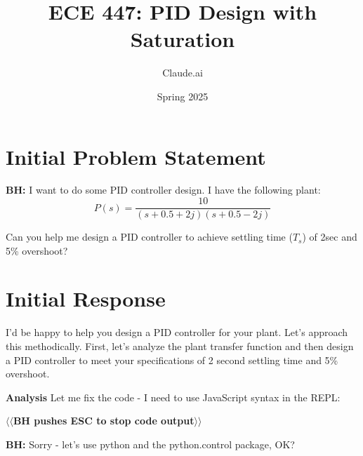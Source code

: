 \documentclass{article}
\title{ECE 447: PID Design with Saturation}
\author{Claude.ai}
\date{Spring 2025}
\begin{document}
\maketitle

\section*{Initial Problem Statement}

\textbf{BH:} I want to do some PID controller design. I have the following plant:
\begin{equation}
P(s) = \frac{10}{(s+0.5+2j)(s+0.5-2j)}
\end{equation}

Can you help me design a PID controller to achieve settling time ($T_s$) of 2sec and 5\% overshoot?

\section*{Initial Response}

\begin{claude}
I'd be happy to help you design a PID controller for your plant. Let's approach this methodically.
First, let's analyze the plant transfer function and then design a PID controller to meet your specifications of 2 second settling time and 5\% overshoot.

\textbf{Analysis}
Let me fix the code - I need to use JavaScript syntax in the REPL:
\end{claude}

\textbf{$\langle\langle$BH pushes ESC to stop code output$\rangle\rangle$}


\textbf{BH:}
Sorry - let's use python and the python.control package, OK?
\end{document}
